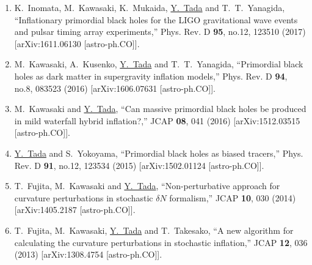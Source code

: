 \documentclass[11pt,a4paper,uplatex,dvipdfmx]{ujarticle} 		%
\newcommand{\研究課題名}{曲率ゆらぎの統計と原始ブラックホール量の精密対応}
\newcommand{\研究機関名}{名古屋大学}
\newcommand{\研究代表者氏名}{多田祐一郎}
\newcommand{\研究期間の最終元号年度}{4}  %
\begin{document}
\begin{enumerate}
	\item K.~Inomata, M.~Kawasaki, K.~Mukaida, \underline{Y.~Tada} and T.~T.~Yanagida,
	``Inflationary primordial black holes for the LIGO gravitational wave events and pulsar timing array experiments,''
	Phys. Rev. D \textbf{95}, no.12, 123510 (2017)
	[arXiv:1611.06130 [astro-ph.CO]].
	\label{ref: PBH LIGO}
	
	\item M.~Kawasaki, A.~Kusenko, \underline{Y.~Tada} and T.~T.~Yanagida,
	``Primordial black holes as dark matter in supergravity inflation models,''
	Phys. Rev. D \textbf{94}, no.8, 083523 (2016)
	[arXiv:1606.07631 [astro-ph.CO]].
	\label{ref: PBH SUGRA}

	\item M.~Kawasaki and \underline{Y.~Tada},
	``Can massive primordial black holes be produced in mild waterfall hybrid inflation?,''
	JCAP \textbf{08}, 041 (2016)
	[arXiv:1512.03515 [astro-ph.CO]].
	\label{ref: PBH hybrid}
	
	\item \underline{Y.~Tada} and S.~Yokoyama,
	``Primordial black holes as biased tracers,''
	Phys. Rev. D \textbf{91}, no.12, 123534 (2015)
	[arXiv:1502.01124 [astro-ph.CO]].
	\label{ref: PBH bias}

	\item T.~Fujita, M.~Kawasaki and \underline{Y.~Tada},
	``Non-perturbative approach for curvature perturbations in stochastic $\delta N$ formalism,''
	JCAP \textbf{10}, 030 (2014)
	[arXiv:1405.2187 [astro-ph.CO]].
	\label{ref: stochastic hybrid}

	\item T.~Fujita, M.~Kawasaki, \underline{Y.~Tada} and T.~Takesako,
	``A new algorithm for calculating the curvature perturbations in stochastic inflation,''
	JCAP \textbf{12}, 036 (2013)
	[arXiv:1308.4754 [astro-ph.CO]].
	\label{ref: stochastic-dN}
			
\end{enumerate}
\end{document}
